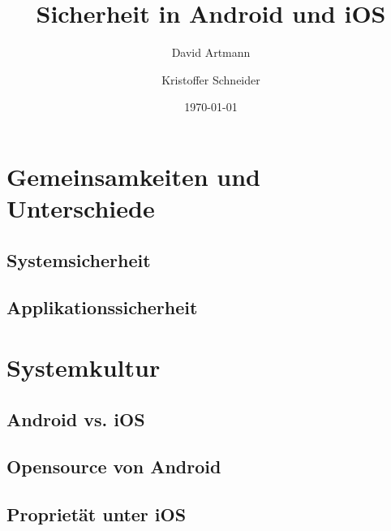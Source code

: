 \documentclass{beamer}
\title{Sicherheit in Android und iOS}
\author{David Artmann\inst{1} \and Kristoffer Schneider\inst{1}}
\institute[Universities of]
{
\inst{1}
Hochschule für angewandte Wissenschaften\\
Würzburg-Schweinfurt
}
\date{\today}
\begin{document}





\section{Gemeinsamkeiten und Unterschiede}
	\subsection[Systemsicherheit]{Systemsicherheit}
		
	\subsection[Applikationssicherheit]{Applikationssicherheit}
		
		
		
		
\section{Systemkultur}
	\subsection{Android vs. iOS}
		
	\subsection{Opensource von Android}
	\subsection{Proprietät unter iOS}
		
		
		
		
		
		
		
		
		
	
\end{document}

